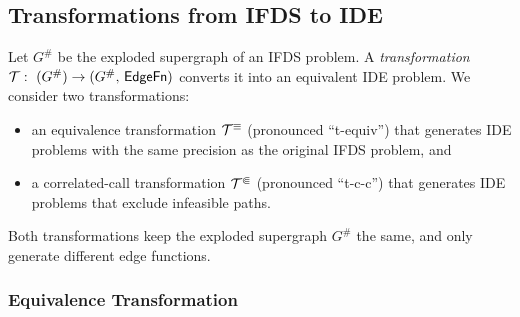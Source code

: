 \subsection{Transformations from IFDS to IDE}\label{seq:transIfdsIde}


Let $G^\#$ be the exploded supergraph of an IFDS problem. A \emph{transformation}
$\mathcal T:\ (G^\#)\to (G^\#,\,\textsf{EdgeFn})$
converts it into an equivalent IDE problem. We consider two transformations:
\begin{itemize}
	\item an equivalence transformation $\mathcal T^\equiv$ (pronounced ``t-equiv'') that generates IDE problems with the same precision as the original IFDS problem, and
  \item a correlated-call transformation $\mathcal T^\Subset$ (pronounced ``t-c-c'') that generates IDE problems that exclude infeasible paths.
\end{itemize}
Both transformations keep the exploded supergraph $G^\#$ the same, and only generate different edge functions.


\subsubsection{Equivalence Transformation}\label{sec:equivtrans}

